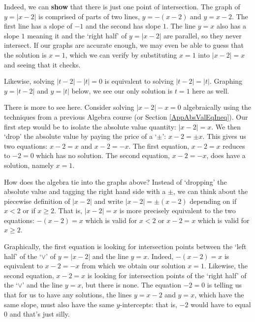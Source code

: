\documentclass{ximera}
\begin{document}
Indeed, we can \textbf{show} that there is just one point of intersection.  The graph of  $y = |x-2|$ is comprised of parts of two lines, $y =-(x-2)$ and $y = x-2$. The first line has a slope of $-1$ and the second has slope $1$.  The line $y = x$ also has a slope $1$ meaning it and the `right half' of $y =|x-2|$  are parallel, so they never intersect.  If our graphs are accurate enough, we may even be able to guess that the solution is $x = 1$, which we can verify by  substituting $x = 1$ into $|x-2| = x$ and seeing that it checks.  

Likewise, solving $|t-2| - |t| = 0$ is equivalent to solving $|t-2| = |t|$.  Graphing $y = |t-2|$ and $y=|t|$ below, we see our only solution is $t = 1$ here as well.

\begin{center}
\end{center}

There is more to see here.  Consider solving $|x-2|-x=0$ algebraically using the techniques from a previous Algebra course (or Section \ref{AppAbsValEqIneq}).  Our first step would be to isolate the absolute value quantity:  $|x-2| = x$.  We  then `drop' the absolute value by paying the price of a `$\pm$':  $x-2 = \pm x$.  This gives us two equations:  $x - 2 = x$ and $x - 2 = -x$.  The first equation, $x-2 = x$ reduces to $-2 = 0$ which has no solution.  The second equation, $x-2 = -x$, does have a solution, namely $x = 1$.  

\medskip

How does the algebra tie into the graphs above?  Instead of `dropping' the absolute value and tagging the right hand side with a $\pm$, we can think about the piecewise definition of $|x-2|$ and write $|x-2| = \pm(x-2)$ depending on if $x < 2$ or if $x \geq 2$.  That is, $|x-2| = x$ is more precisely equivalent to the two equations: $-(x-2) = x$ which is valid for  $x < 2$ or $x-2 = x$   which is valid for $x \geq 2$.  

\medskip

Graphically, the first equation is looking for intersection points between the `left half' of the `$\vee$' of $y = |x-2|$ and the line $y =x$.  Indeed, $-(x-2)=x$ is equivalent to $x-2 = -x$ from which we obtain our solution $x = 1$. Likewise, the second equation, $x-2 = x$  is looking for intersection points of the 	`right half' of the `$\vee$' and the line $y = x$, but there is none.  The equation $-2=0$ is telling us that for us to have any solutions, the lines $y = x-2$ and $y = x$, which have the same slope, must also have the same $y$-intercepts:  that is, $-2$ would have to equal $0$ and that's just silly.  
\end{document}
